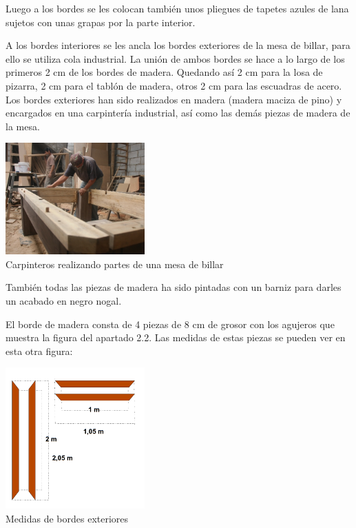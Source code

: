 Luego a los bordes se les colocan también unos pliegues de tapetes azules de lana sujetos con unas grapas por la parte interior.


A los bordes interiores se les ancla los bordes exteriores de la mesa de billar, para ello se utiliza cola industrial. La unión de ambos bordes se hace a lo largo de los primeros 2 cm de los bordes de madera. Quedando así 2 cm para la losa de pizarra,  2 cm para el tablón de madera, otros 2 cm para las escuadras de acero. Los bordes exteriores han sido realizados en madera (madera maciza de pino) y encargados en una carpintería industrial, así como las demás piezas de  madera de la mesa.  

\begin{center}
    		\includegraphics[width=0.4\textwidth]{fc742624-a4ab-44cb-beef-0393ab3abd4a.jpg}
	          \\ \small {Carpinteros realizando partes de una mesa de billar}
	\end{center}



También todas las piezas de madera ha sido pintadas con un barniz para darles un acabado en negro nogal.

El borde de madera consta de 4 piezas de 8 cm de grosor con los agujeros que muestra la figura del apartado 2.2.  Las medidas de estas piezas se pueden ver en esta otra figura:

\begin{center}
    		\includegraphics[width=0.4\textwidth]{Exterior.png}
		 \\ \small {Medidas de bordes exteriores}
	\end{center}

